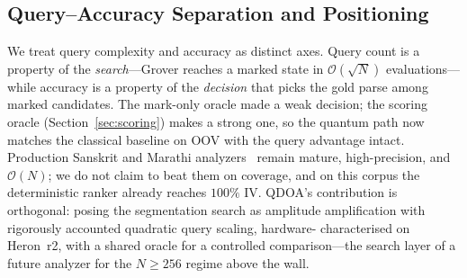 \documentclass[journal]{IEEEtran}
\newcommand{\bigO}{\mathcal{O}}
\newcommand{\sqrtN}{\sqrt{N}}
\begin{document}
\subsection{Query--Accuracy Separation and Positioning}
We treat query complexity and accuracy as distinct axes. Query count is a property
of the \emph{search}---Grover reaches a marked state in $\bigO(\sqrtN)$
evaluations---while accuracy is a property of the \emph{decision} that picks the
gold parse among marked candidates. The mark-only oracle made a weak decision; the
scoring oracle (Section~\ref{sec:scoring}) makes a strong one, so the quantum path
now matches the classical baseline on OOV with the query advantage intact.
Production Sanskrit and Marathi analyzers~\cite{jha2009,huet2005,bapat2010} remain
mature, high-precision, and $\bigO(N)$; we do not claim to beat them on coverage,
and on this corpus the deterministic ranker already reaches $100\%$ IV. QDOA's
contribution is orthogonal: posing the segmentation search as amplitude
amplification with rigorously accounted quadratic query scaling, hardware-%
characterised on Heron~r2, with a shared oracle for a controlled comparison---the
search layer of a future analyzer for the $N\!\ge\!256$ regime above the wall.
\end{document}
